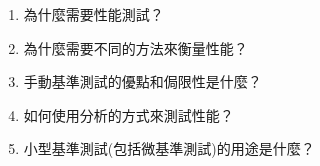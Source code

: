 \begin{enumerate}
\item 為什麼需要性能測試？
\item 為什麼需要不同的方法來衡量性能？
\item 手動基準測試的優點和侷限性是什麼？
\item 如何使用分析的方式來測試性能？
\item 小型基準測試(包括微基準測試)的用途是什麼？
\end{enumerate}